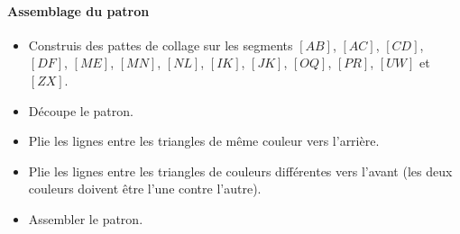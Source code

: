 \paragraph{Assemblage du patron}\hfill\newline
\begin{itemize}
\item Construis des pattes de collage sur les segments $[AB]$, $[AC]$,
  $[CD]$, $[DF]$, $[ME]$, $[MN]$, $[NL]$, $[IK]$, $[JK]$, $[OQ]$,
  $[PR]$, $[UW]$ et $[ZX]$.
\item Découpe le patron.
\item Plie les lignes entre les triangles de même couleur vers
  l'arrière.
\item Plie les lignes entre les triangles de couleurs différentes vers l'avant (les deux couleurs doivent être l'une contre l'autre).
\item Assembler le patron.
\end{itemize}
